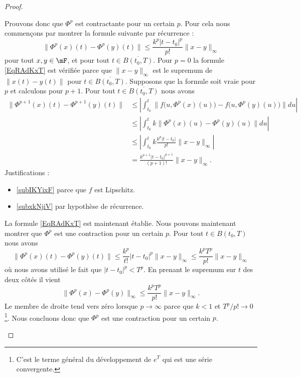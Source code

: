 \begin{proof}
\begin{subproof}
    Prouvons donc que \( \Phi^p\) est contractante pour un certain \( p\). Pour cela nous commençons par montrer la formule suivante par récurrence :
    \begin{equation}        \label{EqRAdKxT}
        \big\| \Phi^p(x)(t)-\Phi^p(y)(t) \big\|\leq \frac{ k^p| t-t_0 |^p }{ p! }\| x-y \|_{\infty}
    \end{equation}
    pour tout \( x,y\in\mF\), et pour tout \( t\in\overline{ B(t_0,T) }\). Pour \( p=0\) la formule \eqref{EqRAdKxT} est vérifiée parce que \( \| x-y \|_{\infty}\) est le supremum de \( \| x(t)-y(t) \|\) pour \( t\in\overline{ B(t_0,T) }\). Supposons que la formule soit vraie pour \( p\) et calculons pour \( p+1\). Pour tout \( t\in\overline{ B(t_0,T) }\) nous avons
    \begin{subequations}
        \begin{align}
            \big\| \Phi^{p+1}(x)(t)-\Phi^{p+1}(y)(t) \big\|&\leq \left| \int_{t_0}^t\big\| f\big( u,\Phi^p(x)(u) \big)-f\big( u,\Phi^p(y)(u) \big) \big\|du \right| \\
            &\leq \left| \int_{t_0}^tk\| \Phi^p(x)(u)-\Phi^p(y)(u) \|du \right|    \label{subIKYixF}\\
            &\leq \left| \int_{t_0}^tk\frac{ k^p| t-t_0 | }{ p! }\| x-y \|_{\infty} \right| \label{subxkNjiV} \\
            &=\frac{ k^{p+1}| t-t_0 |^{p+1} }{ (p+1)! }\| x-y \|_{\infty}.
        \end{align}
    \end{subequations}
    Justifications :
    \begin{itemize}
        \item \eqref{subIKYixF} parce que \( f\) est Lipschitz.
        \item \eqref{subxkNjiV} par hypothèse de récurrence.
    \end{itemize}
    La formule \eqref{EqRAdKxT} est maintenant établie. Nous pouvons maintenant montrer que \( \Phi^p\) est une contraction pour un certain \( p\). Pour tout \( t\in \overline{ B(t_0,T) }\) nous avons
    \begin{equation}
         \| \Phi^p(x)(t)-\Phi^p(y)(t) \|\leq \frac{ k^p }{ t! }| t-t_0 |^p\| x-y \|_{\infty}     \leq \frac{ k^pT^p }{ p! }\| x-y \|_{\infty}
    \end{equation}
    où nous avons utilisé le fait que \( | t-t_0 |^p<T^p\). En prenant le supremum sur \( t\) des deux côtés il vient
    \begin{equation}
        \| \Phi^p(x)-\Phi^p(y) \|_{\infty}\leq\frac{ k^pT^p }{ p! }\| x-y \|_{\infty}.
    \end{equation}
    Le membre de droite tend vers zéro lorsque \( p\to\infty\) parce que \( k<1\) et \( T^p/p!\to 0\)\footnote{C'est le terme général du développement de \(  e^{T}\) qui est une série convergente.}. Nous concluons donc que \( \Phi^p\) est une contraction pour un certain \( p\).


\end{subproof}
\end{proof}
